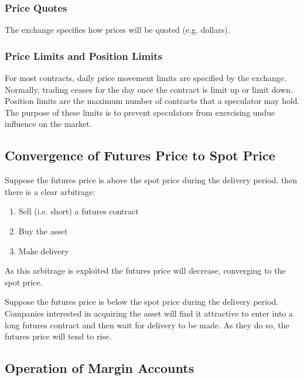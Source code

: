 \subsubsection*{Price Quotes}

The exchange specifies how prices will be quoted (e.g. dollars).

\subsubsection*{Price Limits and Position Limits}

For most contracts, daily price movement limits are specified by the exchange. Normally, trading ceases for the day once the contract is limit up or limit down. Position limits are the maximum number of contracts that a speculator may hold.
The purpose of these limits is to prevent speculators from exercising undue influence on
the market.

\subsection{Convergence of Futures Price to Spot Price}

Suppose the futures price is above the spot price during the delivery period, then there is a clear arbitrage:
\begin{enumerate}
    \item Sell (i.e. short) a futures contract
    \item Buy the asset
    \item Make delivery
\end{enumerate}
As this arbitrage is exploited the futures price will decrease, converging to the spot price.

Suppose the futures price is below the spot price during the delivery period. Companies interested in acquiring the asset will find it attractive to enter into a long futures contract and then wait for delivery to be made. As they do so, the futures
price will tend to rise.

\subsection{Operation of Margin Accounts}
\bigskip

